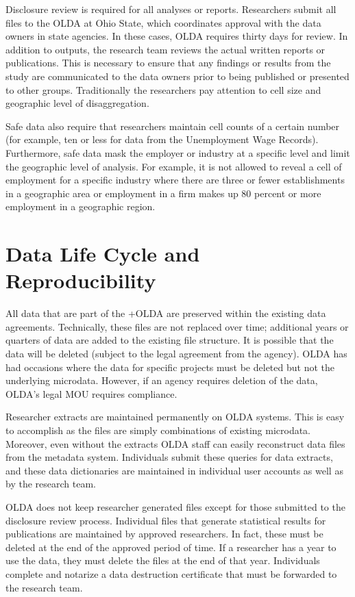 \documentclass[
]{book}
\begin{document}
Disclosure review is required for all analyses or reports. Researchers submit all files to the OLDA at Ohio State, which coordinates approval with the data owners in state agencies. In these cases, OLDA requires thirty days for review. In addition to outputs, the research team reviews the actual written reports or publications. This is necessary to ensure that any findings or results from the study are communicated to the data owners prior to being published or presented to other groups. Traditionally the researchers pay attention to cell size and geographic level of disaggregation.

Safe data also require that researchers maintain cell counts of a certain number (for example, ten or less for data from the Unemployment Wage Records). Furthermore, safe data mask the employer or industry at a specific level and limit the geographic level of analysis. For example, it is not allowed to reveal a cell of employment for a specific industry where there are three or fewer establishments in a geographic area or employment in a firm makes up 80 percent or more employment in a geographic region.

\hypertarget{data-life-cycle-and-reproducibility}{%
\section{Data Life Cycle and Reproducibility}\label{data-life-cycle-and-reproducibility}}

All data that are part of the +OLDA\textbar{} are preserved within the existing data agreements. Technically, these files are not replaced over time; additional years or quarters of data are added to the existing file structure. It is possible that the data will be deleted (subject to the legal agreement from the agency). OLDA has had occasions where the data for specific projects must be deleted but not the underlying microdata. However, if an agency requires deletion of the data, OLDA's legal MOU requires compliance.

Researcher extracts are maintained permanently on OLDA systems. This is easy to accomplish as the files are simply combinations of existing microdata. Moreover, even without the extracts OLDA staff can easily reconstruct data files from the metadata system. Individuals submit these queries for data extracts, and these data dictionaries are maintained in individual user accounts as well as by the research team.

OLDA does not keep researcher generated files except for those submitted to the disclosure review process. Individual files that generate statistical results for publications are maintained by approved researchers. In fact, these must be deleted at the end of the approved period of time. If a researcher has a year to use the data, they must delete the files at the end of that year. Individuals complete and notarize a data destruction certificate that must be forwarded to the research team.
\end{document}
